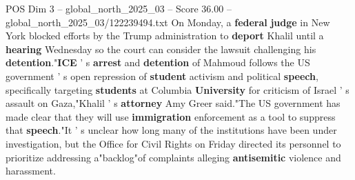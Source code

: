 \begin{textsample}{POS Dim 3 – global\_north\_2025\_03 – Score 36.00 – global\_north\_2025\_03/122239494.txt}
On Monday, a \textbf{federal} \textbf{judge} in New York blocked efforts by the Trump administration to \textbf{deport} Khalil until a \textbf{hearing} Wednesday so the court can consider the lawsuit challenging his \textbf{detention}."\textbf{ICE} ' s \textbf{arrest} and \textbf{detention} of Mahmoud follows the US government ' s open repression of \textbf{student} activism and political \textbf{speech}, specifically targeting \textbf{students} at Columbia \textbf{University} for criticism of Israel ' s assault on Gaza,"Khalil ' s \textbf{attorney} Amy Greer said."The US government has made clear that they will use \textbf{immigration} enforcement as a tool to suppress that \textbf{speech}."It ' s unclear how long many of the institutions have been under investigation, but the Office for Civil Rights on Friday directed its personnel to prioritize addressing a"backlog"of complaints alleging \textbf{antisemitic} violence and harassment.

\end{textsample}
